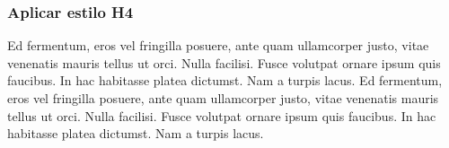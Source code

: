 \documentclass[10.5pt,a4paper]{article}
\begin{document}
\subsubsection{Aplicar estilo H4}
 
Ed fermentum, eros vel fringilla posuere, ante quam ullamcorper justo, vitae venenatis mauris tellus ut orci. Nulla facilisi. Fusce volutpat ornare ipsum quis faucibus. In hac habitasse platea dictumst. Nam a turpis lacus. Ed fermentum, eros vel fringilla posuere, ante quam ullamcorper justo, vitae venenatis mauris tellus ut orci. Nulla facilisi. Fusce volutpat ornare ipsum quis faucibus. In hac habitasse platea dictumst. Nam a turpis lacus. 
\newpage

\finalpageamz

\end{document}
